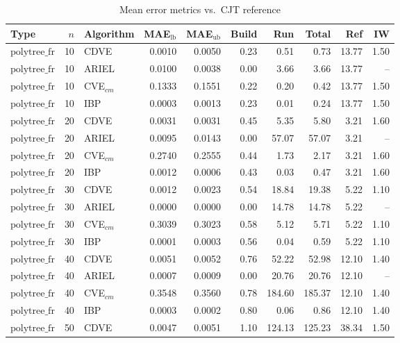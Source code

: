\begin{table}[ht]
\centering
\scriptsize
\caption{Mean error metrics vs.\ CJT reference}
\begin{tabular}{lrlrrrrrrr}
\toprule
Type & $n$ & Algorithm & MAE$_{\text{lb}}$ & MAE$_{\text{ub}}$ & Build & Run & Total & Ref & IW \\
\midrule
$\text{polytree\_fr}$ & 10 & CDVE & 0.0010 & 0.0050 & 0.23 & 0.51 & 0.73 & 13.77 & 1.50 \\
$\text{polytree\_fr}$ & 10 & ARIEL & 0.0100 & 0.0038 & 0.00 & 3.66 & 3.66 & 13.77 & -- \\
$\text{polytree\_fr}$ & 10 & CVE$_{cm}$ & 0.1333 & 0.1551 & 0.22 & 0.20 & 0.42 & 13.77 & 1.50 \\
$\text{polytree\_fr}$ & 10 & IBP & 0.0003 & 0.0013 & 0.23 & 0.01 & 0.24 & 13.77 & 1.50 \\
\hline
$\text{polytree\_fr}$ & 20 & CDVE & 0.0031 & 0.0031 & 0.45 & 5.35 & 5.80 & 3.21 & 1.60 \\
$\text{polytree\_fr}$ & 20 & ARIEL & 0.0095 & 0.0143 & 0.00 & 57.07 & 57.07 & 3.21 & -- \\
$\text{polytree\_fr}$ & 20 & CVE$_{cm}$ & 0.2740 & 0.2555 & 0.44 & 1.73 & 2.17 & 3.21 & 1.60 \\
$\text{polytree\_fr}$ & 20 & IBP & 0.0012 & 0.0006 & 0.43 & 0.03 & 0.47 & 3.21 & 1.60 \\
\hline
$\text{polytree\_fr}$ & 30 & CDVE & 0.0012 & 0.0023 & 0.54 & 18.84 & 19.38 & 5.22 & 1.10 \\
$\text{polytree\_fr}$ & 30 & ARIEL & 0.0000 & 0.0000 & 0.00 & 14.78 & 14.78 & 5.22 & -- \\
$\text{polytree\_fr}$ & 30 & CVE$_{cm}$ & 0.3039 & 0.3023 & 0.58 & 5.12 & 5.71 & 5.22 & 1.10 \\
$\text{polytree\_fr}$ & 30 & IBP & 0.0001 & 0.0003 & 0.56 & 0.04 & 0.59 & 5.22 & 1.10 \\
\hline
$\text{polytree\_fr}$ & 40 & CDVE & 0.0051 & 0.0052 & 0.76 & 52.22 & 52.98 & 12.10 & 1.40 \\
$\text{polytree\_fr}$ & 40 & ARIEL & 0.0007 & 0.0009 & 0.00 & 20.76 & 20.76 & 12.10 & -- \\
$\text{polytree\_fr}$ & 40 & CVE$_{cm}$ & 0.3548 & 0.3560 & 0.78 & 184.60 & 185.37 & 12.10 & 1.40 \\
$\text{polytree\_fr}$ & 40 & IBP & 0.0003 & 0.0002 & 0.80 & 0.06 & 0.86 & 12.10 & 1.40 \\
\hline
$\text{polytree\_fr}$ & 50 & CDVE & 0.0047 & 0.0051 & 1.10 & 124.13 & 125.23 & 38.34 & 1.50 \\

\end{tabular}
\end{table}
